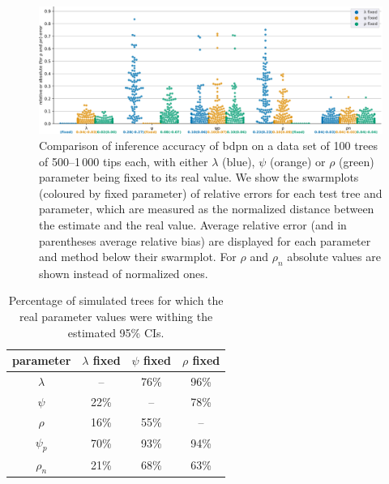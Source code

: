 \documentclass[a4paper,10pt]{article}
\begin{document}
\begin{figure}[!pht]
\centering 
\includegraphics[width=1\textwidth]{Fig_errors.eps}
\caption{Comparison of inference accuracy of bdpn on a data set of 100 trees of 500--1\,000 tips each, with either $\lambda$ (blue), $\psi$ (orange) or $\rho$ (green) parameter being fixed to its real value.
We show the swarmplots (coloured by fixed parameter) of relative errors for each test tree and parameter, which are measured as the normalized distance between the estimate and the real value. Average relative error (and in parentheses average relative bias) are displayed for each parameter and method below their swarmplot. For $\rho$ and $\rho_n$ absolute values are shown instead of normalized ones. } 
\label{fig:sim} 
\end{figure}
 
 \begin{table}[!h]\centering
\small
\caption{Percentage of simulated trees for which the real parameter values were withing the estimated 95\% CIs. \smallskip}
\begin{tabular}{c|ccc}
\textbf{parameter} & \textbf{$\lambda$ fixed} & \textbf{$\psi$ fixed} & \textbf{$\rho$ fixed} \\
\toprule 
 $\lambda$ & -- &  76\% & 96\% \\
 $\psi$ & 22\% & -- & 78\% \\
 $\rho$ & 16\% & 55\%  & -- \\
 $\psi_p$ & 70\% & 93\% & 94\% \\
 $\rho_n$ & 21\% & 68\% & 63\% \\
\bottomrule
\end{tabular}
\label{tbl:ci}
\end{table}
\end{document}
